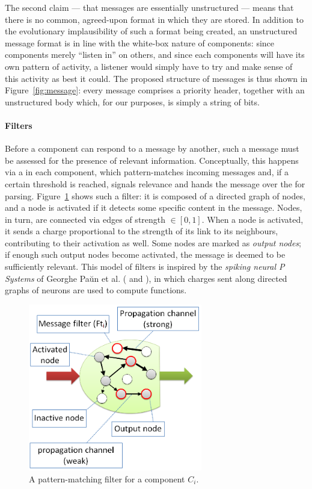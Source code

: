 \documentclass[]{scrartcl}
\theoremstyle{break}
\begin{document}
The second claim --- that messages are essentially unstructured --- means that there is no common, agreed-upon format in which they are stored. In addition to the evolutionary implausibility of such a format being created, an unstructured message format is in line with the white-box nature of components: since components merely ``listen in'' on others, and since each components will have its own pattern of activity, a listener would simply have to try and make sense of this activity as best it could. The proposed structure of messages is thus shown in Figure~\ref{fig:message}: every message comprises a priority header, together with an unstructured body which, for our purposes, is simply a string of bits.

\paragraph{Filters} Before a component can respond to a message by another, such a message must be assessed for the presence of relevant information. Conceptually, this happens via a  in each component, which pattern-matches incoming messages and, if a certain threshold is reached, signals relevance and hands the message over the  for parsing. Figure~\ref{fig:filter} shows such a filter: it is composed of a directed graph of nodes, and a node is activated if it detects some specific content in the message. Nodes, in turn, are connected via edges of strength $\in [0,1]$. When a node is activated, it sends a charge proportional to the strength of its link to its neighbours, contributing to their activation as well. Some nodes are marked as {\em output nodes}; if enough such output nodes become activated, the message is deemed to be sufficiently relevant. This model of filters is inspired by the {\em spiking neural P Systems} of Georghe Pa\u{u}n et al. (\cite[p. 337]{membraneComputing} and \cite{spikingNeural}), in which charges sent along directed graphs of neurons are used to compute functions.

\begin{figure}[!h]
	\centering
	\includegraphics[width=215pt]{figs/filter.png}
	\caption{A pattern-matching filter for a component $C_i$.}
	\label{fig:filter}
\end{figure}
\end{document}
